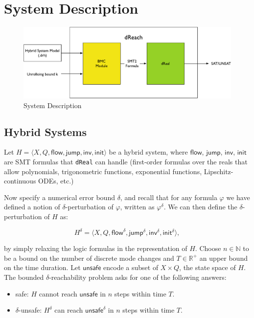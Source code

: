 \section{System Description}

\begin{figure}
  \centering
  \includegraphics[width=\textwidth]{images/dReach}
  \caption{System Description}
  \label{fig:system-description}
\end{figure}

\subsection{Hybrid Systems}

Let $H = \langle X, Q, \mathsf{flow}, \mathsf{jump},
\mathsf{inv},\mathsf{init}\rangle$ be a hybrid system, where
$\mathsf{flow}$, $\mathsf{jump}$, $\mathsf{inv}$, $\mathsf{init}$ are
SMT formulas that \texttt{dReal} can handle (first-order formulas over
the reals that allow polynomials, trigonometric functions, exponential
functions, Lipschitz-continuous ODEs, etc.)

Now specify a numerical error bound $\delta$, and recall that for any
formula $\varphi$ we have defined a notion of $\delta$-perturbation of
$\varphi$, written as $\varphi^{\delta}$. We can then define the
$\delta$-perturbation of $H$ as:

\[
H^{\delta} = \langle X, Q, {\mathsf{flow}}^{\delta},
{\mathsf{jump}}^{\delta}, {\mathsf{inv}}^{\delta},
{\mathsf{init}}^{\delta}\rangle,
\]

by simply relaxing the logic formulas in the representation of $H$.
Choose $n\in\mathbb{N}$ to be a bound on the number of discrete mode
changes and $T\in \mathbb{R}^+$ an upper bound on the time duration.
Let $\mathsf{unsafe}$ encode a subset of $X\times Q$, the state space
of $H$. The bounded $\delta$-reachability problem asks for one of the
following answers:

\begin{itemize}
\item  safe: $H$ cannot reach $\mathsf{unsafe}$ in $n$ steps within
  time $T$.
\item $\delta$-unsafe: $H^{\delta}$ can reach ${\mathsf{unsafe}}^{\delta}$ in $n$ steps within time $T$.
\end{itemize}

